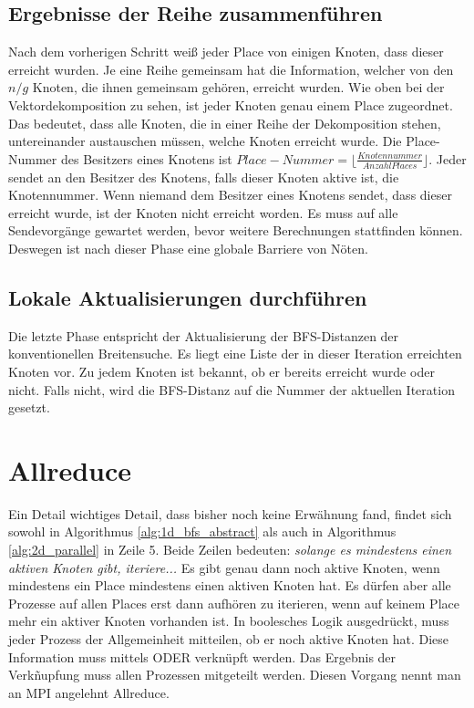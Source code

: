 \subsection{Ergebnisse der Reihe zusammenführen} %
\label{ssub:ergebnisse_der_reihe_zusammenf_hren}
Nach dem vorherigen Schritt weiß jeder Place von einigen Knoten, dass dieser erreicht wurden. Je eine Reihe gemeinsam hat die Information, welcher von den $n/g$ Knoten, die ihnen gemeinsam gehören, erreicht wurden. Wie oben bei der Vektordekomposition zu sehen, ist jeder Knoten genau einem Place zugeordnet. Das bedeutet, dass alle Knoten, die in einer Reihe der Dekomposition stehen, untereinander austauschen müssen, welche Knoten erreicht wurde. Die Place-Nummer des Besitzers eines Knotens ist $\mathit{Place-Nummer}=\lfloor\frac{\mathit{Knotennummer}}{\mathit{Anzahl Places}}\rfloor$. Jeder sendet an den Besitzer des Knotens, falls dieser Knoten aktive ist, die Knotennummer. Wenn niemand dem Besitzer eines Knotens sendet, dass dieser erreicht wurde, ist der Knoten nicht erreicht worden. Es muss auf alle Sendevorgänge gewartet werden, bevor weitere Berechnungen stattfinden können. Deswegen ist nach dieser Phase eine globale Barriere von Nöten.

\subsection{Lokale Aktualisierungen durchführen} %
\label{ssub:lokale_updates_durchf_hren}
Die letzte Phase entspricht der Aktualisierung der BFS-Distanzen der konventionellen Breitensuche. Es liegt eine Liste der in dieser Iteration erreichten Knoten vor. Zu jedem Knoten ist bekannt, ob er bereits erreicht wurde oder nicht. Falls nicht, wird die BFS-Distanz auf die Nummer der aktuellen Iteration gesetzt.

\section{Allreduce} %
\label{sub:allreduce}
Ein Detail wichtiges Detail, dass bisher noch keine Erwähnung fand, findet sich sowohl in Algorithmus \ref{alg:1d_bfs_abstract} als auch in Algorithmus \ref{alg:2d_parallel} in Zeile 5. Beide Zeilen bedeuten: \textit{solange es mindestens einen aktiven Knoten gibt, iteriere...} Es gibt genau dann noch aktive Knoten, wenn mindestens ein Place mindestens einen aktiven Knoten hat. Es dürfen aber alle Prozesse auf allen Places erst dann aufhören zu iterieren, wenn auf keinem Place mehr ein aktiver Knoten vorhanden ist. In boolesches Logik ausgedrückt, muss jeder Prozess der Allgemeinheit mitteilen, ob er noch aktive Knoten hat. Diese Information muss mittels ODER verknüpft werden. Das Ergebnis der Verkñupfung muss allen Prozessen mitgeteilt werden. Diesen Vorgang nennt man an MPI angelehnt Allreduce.
